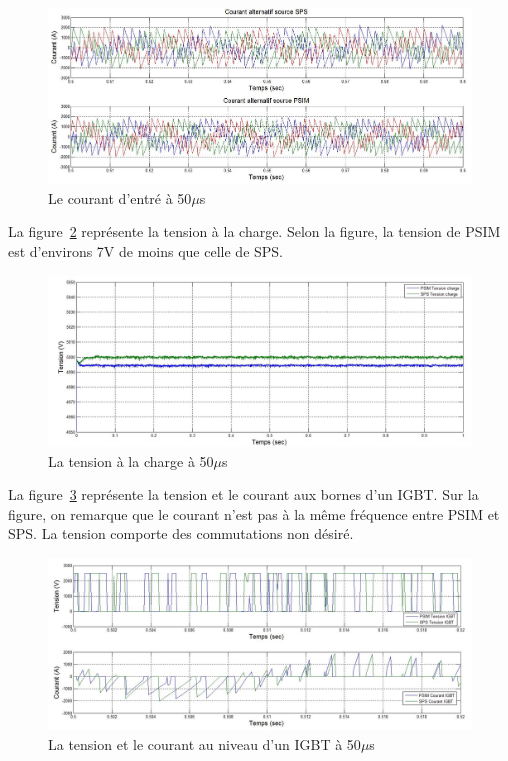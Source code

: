 \documentclass[11pt,letterpaper,final]{report}
\begin{document}
\begin{figure}[htb]
\centering
\includegraphics[scale=0.5]{Fig/AFE3LEVEL/50u/cour_al.jpg}
\caption{Le courant d'entré à 50$\mu$s}
\label{AF_3_cou50}
\end{figure}

La figure~\ref{AF_3_vch50} représente la tension à la charge. Selon la figure, la tension de PSIM est d'environs 7V de moins que celle de SPS.
\begin{figure}[htb]
\centering
\includegraphics[scale=0.5]{Fig/AFE3LEVEL/50u/vch.jpg}
\caption{La tension à la charge à 50$\mu$s}
\label{AF_3_vch50}
\end{figure}

La figure~\ref{AF_3_IGBT50} représente la tension et le courant aux bornes d'un IGBT. Sur la figure, on remarque que le courant n'est pas à la même fréquence entre PSIM et SPS. La tension comporte des commutations non désiré.
\begin{figure}[htb]
\centering
\includegraphics[scale=0.5]{Fig/AFE3LEVEL/50u/IGBT.jpg}
\caption{La tension et le courant au niveau d'un IGBT à 50$\mu$s}
\label{AF_3_IGBT50}
\end{figure}
\end{document}
